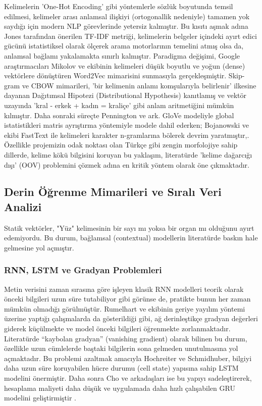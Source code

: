 \documentclass[12pt,a4paper]{report}
\begin{document}
 Kelimelerin 'One-Hot Encoding' gibi yöntemlerle sözlük boyutunda temsil edilmesi, kelimeler arası anlamsal ilişkiyi (ortogonallik nedeniyle) tamamen yok saydığı için modern NLP görevlerinde yetersiz kalmıştır. Bu kısıtı aşmak adına Jones tarafından önerilen TF-IDF metriği, kelimelerin belgeler içindeki ayırt edici gücünü istatistiksel olarak ölçerek arama motorlarının temelini atmış olsa da, anlamsal bağlamı yakalamakta sınırlı kalmıştır\cite{sparck1972statistical}. Paradigma değişimi, Google araştırmacıları Mikolov ve ekibinin kelimeleri düşük boyutlu ve yoğun (dense) vektörlere dönüştüren Word2Vec mimarisini sunmasıyla gerçekleşmiştir\cite{mikolov2013distributed}. Skip-gram ve CBOW mimarileri, 'bir kelimenin anlamı komşularıyla belirlenir' ilkesine dayanan Dağıtımsal Hipotezi (Distributional Hypothesis) kanıtlamış ve vektör uzayında 'kral - erkek + kadın = kraliçe' gibi anlam aritmetiğini mümkün kılmıştır. Daha sonraki süreçte Pennington ve ark. GloVe modeliyle global istatistikleri matris ayrıştırma yöntemiyle modele dahil ederken; Bojanowski ve ekibi FastText ile kelimeleri karakter n-gramlarına bölerek devrim yaratmıştır\cite{pennington2014glove},\cite{bojanowski2017fasttext}.
 Özellikle projemizin odak noktası olan Türkçe gibi zengin morfolojiye sahip dillerde, kelime kökü bilgisini koruyan bu yaklaşım, literatürde 'kelime dağarcığı dışı' (OOV) problemini çözmek adına en kritik yöntem olarak öne çıkmaktadır.

\subsection{Derin Öğrenme Mimarileri ve Sıralı Veri Analizi}
Statik vektörler, "Yüz" kelimesinin bir sayı mı yoksa bir organ mı olduğunu ayırt edemiyordu. Bu durum, bağlamsal (contextual) modellerin literatürde baskın hale gelmesine yol açmıştır.

\subsubsection{RNN, LSTM ve Gradyan Problemleri}
Metin verisini zaman sırasına göre işleyen klasik RNN modelleri teorik olarak önceki bilgileri uzun süre tutabiliyor gibi görünse de, pratikte bunun her zaman mümkün olmadığı görülmüştür. Rumelhart ve ekibinin geriye yayılım yöntemi üzerine yaptığı çalışmalarda da gösterildiği gibi, ağ derinleştikçe gradyan değerleri giderek küçülmekte ve model önceki bilgileri öğrenmekte zorlanmaktadır\cite{rumelhart1986learning}. Literatürde “kaybolan gradyan” (vanishing gradient) olarak bilinen bu durum, özellikle uzun cümlelerde baştaki bilgilerin sona gelmeden unutulmasına yol açmaktadır. Bu problemi azaltmak amacıyla Hochreiter ve Schmidhuber, bilgiyi daha uzun süre koruyabilen hücre durumu (cell state) yapısına sahip LSTM modelini önermiştir\cite{hochreiter1997long}. Daha sonra Cho ve arkadaşları ise bu yapıyı sadeleştirerek, hesaplama maliyeti daha düşük ve uygulamada daha hızlı çalışabilen GRU modelini geliştirmiştir \cite{cho2014gru}.
\end{document}
